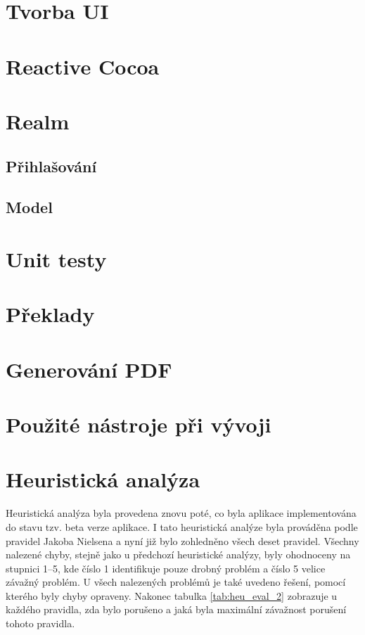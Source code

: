 \documentclass[thesis=M,czech]{FITthesis}[2012/06/26]
\begin{document}
\section{Tvorba UI}

\section{Reactive Cocoa}

\section{Realm}

	\subsection{Přihlašování}
	
	\subsection{Model}

\section{Unit testy}

\section{Překlady}

\section{Generování PDF}

\section{Použité nástroje při vývoji}

\section{Heuristická analýza}
Heuristická analýza byla provedena znovu poté, co byla aplikace implementována do stavu tzv. beta verze aplikace. I tato heuristická analýze byla prováděna podle pravidel Jakoba Nielsena a nyní již bylo zohledněno všech deset pravidel. Všechny nalezené chyby, stejně jako u předchozí heuristické analýzy, byly ohodnoceny na stupnici 1--5, kde číslo 1 identifikuje pouze drobný problém a číslo 5 velice závažný problém. U všech nalezených problémů je také uvedeno řešení, pomocí kterého byly chyby opraveny. Nakonec tabulka \ref{tab:heu_eval_2} zobrazuje u každého pravidla, zda bylo porušeno a jaká byla maximální závažnost porušení tohoto pravidla.
\end{document}
